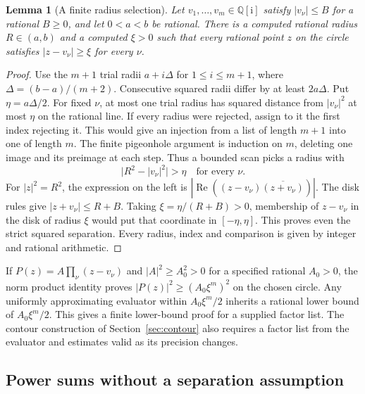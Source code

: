 \documentclass[11pt]{amsart}
\newtheorem{lemma}[theorem]{Lemma}
\theoremstyle{definition}
\theoremstyle{remark}
\numberwithin{equation}{section}
\newcommand{\QQi}{\mathbb Q[\mathrm i]}
\newcommand{\re}{\operatorname{Re}}
\begin{document}
\begin{lemma}[A finite radius selection]\label{lem:radius-selection}
Let $v_1,\ldots,v_m\in\QQi$ satisfy $|v_\nu|\le B$ for a rational
$B\ge0$, and let $0<a<b$ be rational. There is a computed
rational radius $R\in(a,b)$ and a computed $\xi>0$ such that
every rational point $z$ on the circle satisfies
$|z-v_\nu|\ge\xi$ for every $\nu$.
\end{lemma}
\begin{proof}
Use the $m+1$ trial radii $a+i\Delta$ for $1\le i\le m+1$,
where $\Delta=(b-a)/(m+2)$. Consecutive squared radii differ by
at least $2a\Delta$. Put $\eta=a\Delta/2$. For fixed $\nu$,
at most one trial radius has squared distance from $|v_\nu|^2$
at most $\eta$ on the rational line. If every radius were rejected,
assign to it the first index rejecting it. This would give an
injection from a list of length $m+1$ into one of length $m$.
The finite pigeonhole argument is induction on $m$, deleting
one image and its preimage at each step. Thus a bounded scan
picks a radius with
\[
   \bigl| R^2-|v_\nu|^2\bigr|>\eta\quad\text{for every }\nu.
\]
For $|z|^2=R^2$, the expression on the left is
$|\re((z-v_\nu)\overline{(z+v_\nu)})|$.
The disk rules give $|z+v_\nu|\le R+B$. Taking
$\xi=\eta/(R+B)>0$, membership of $z-v_\nu$ in the disk of
radius $\xi$ would put that coordinate in $[-\eta,\eta]$.
This proves even the strict squared separation. Every radius,
index and comparison is given by integer and rational arithmetic.
\end{proof}

If $P(z)=A\prod_\nu(z-v_\nu)$ and $|A|^2\ge A_0^2>0$
for a specified rational $A_0>0$, the norm product identity
proves $|P(z)|^2\ge(A_0\xi^m)^2$ on the chosen circle.
Any uniformly approximating evaluator within $A_0\xi^m/2$
inherits a rational lower bound of $A_0\xi^m/2$. This gives a
finite lower-bound proof for a supplied factor list.
The contour construction of Section~\ref{sec:contour} also
requires a factor list from the evaluator and estimates valid
as its precision changes.

\subsection{Power sums without a separation assumption}
\end{document}
